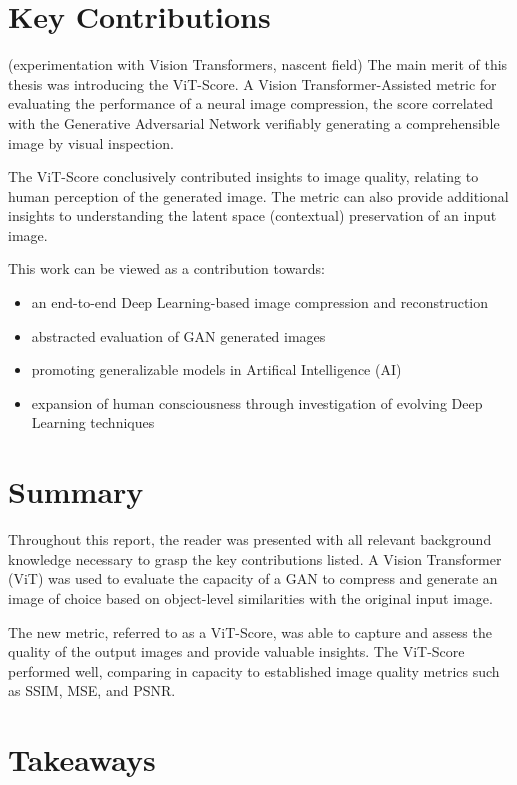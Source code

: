 \section{Key Contributions}

(experimentation with Vision Transformers, nascent field)
The main merit of this thesis was introducing the ViT-Score.
A Vision Transformer-Assisted metric for evaluating the performance of a neural image compression, the score
correlated with the Generative Adversarial Network verifiably generating a comprehensible image by visual inspection.

The ViT-Score conclusively contributed insights to image quality, relating to human perception of the generated image. 
The metric can also provide additional insights to understanding the latent space (contextual) preservation of an input image.

This work can be viewed as a contribution towards:

\begin{itemize}
    \item an end-to-end Deep Learning-based image compression and reconstruction 
    \item abstracted evaluation of GAN generated images 
	\item promoting generalizable models in Artifical Intelligence (AI) 
	\item expansion of human consciousness through investigation of evolving Deep Learning techniques
\end{itemize} 


\section{Summary}

Throughout this report, the reader was presented with all relevant background knowledge necessary 
to grasp the key contributions listed. 
A Vision Transformer (ViT) was used to evaluate the capacity of 
a GAN to compress and generate an image of choice based on object-level similarities with the original input image.

The new metric, referred to as a ViT-Score, was able to capture and assess the quality of the output images and provide 
valuable insights. The ViT-Score performed well, comparing in capacity to established image quality metrics such as
SSIM, MSE, and PSNR. 


\section{Takeaways}

